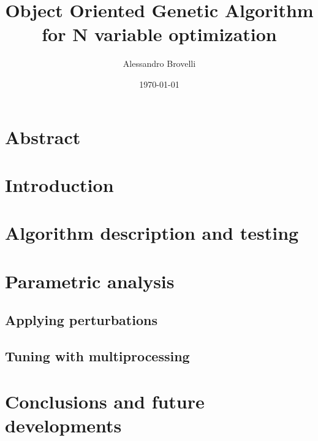 \documentclass{article}
\title{Object Oriented Genetic Algorithm for N variable optimization}
\author{Alessandro Brovelli}
\date{\today}
\begin{document}
\maketitle

\section*{Abstract}

\section{Introduction}

\section{Algorithm description and testing}

\section{Parametric analysis}
\subsection{Applying perturbations}
\subsection{Tuning with multiprocessing}

\section{Conclusions and future developments}
\end{document}
